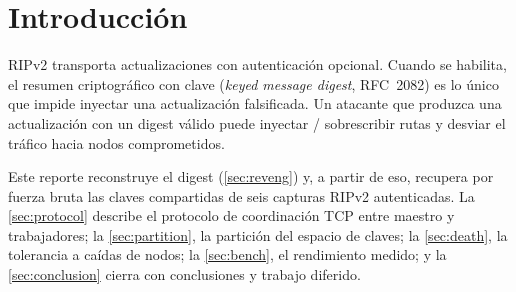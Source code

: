 \section{Introducción}\label{sec:intro}
RIPv2 transporta actualizaciones con autenticación opcional. Cuando se habilita, el resumen criptográfico con clave (\emph{keyed message digest}, RFC~2082) es lo único que impide inyectar una actualización falsificada. Un atacante que produzca una actualización con un digest válido puede inyectar / sobrescribir rutas y desviar el tráfico hacia nodos comprometidos.

Este reporte reconstruye el digest (\autoref{sec:reveng}) y, a partir de eso, recupera por fuerza bruta las claves compartidas de seis capturas RIPv2 autenticadas. La \autoref{sec:protocol} describe el protocolo de coordinación TCP entre maestro y trabajadores; la \autoref{sec:partition}, la partición del espacio de claves; la \autoref{sec:death}, la tolerancia a caídas de nodos; la \autoref{sec:bench}, el rendimiento medido; y la \autoref{sec:conclusion} cierra con conclusiones y trabajo diferido.
